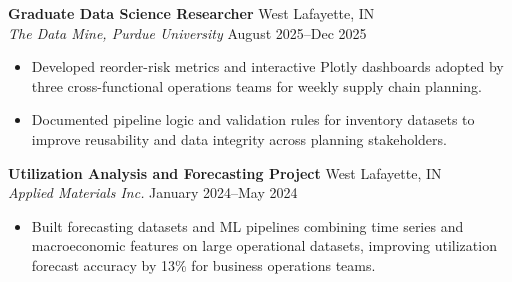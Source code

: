 \documentclass[11pt,a4paper]{article}
\begin{document}
\noindent
\textbf{Graduate Data Science Researcher} \hfill West Lafayette, IN \\
\textit{The Data Mine, Purdue University} \hfill August 2025--Dec 2025
\begin{itemize}[leftmargin=*, noitemsep, topsep=0pt]
    \item Developed reorder-risk metrics and interactive Plotly dashboards adopted by three cross-functional operations teams for weekly supply chain planning.
    \item Documented pipeline logic and validation rules for inventory datasets to improve reusability and data integrity across planning stakeholders.
\end{itemize}
\vspace{6pt}

\noindent
\textbf{Utilization Analysis and Forecasting Project} \hfill West Lafayette, IN \\
\textit{Applied Materials Inc.} \hfill January 2024--May 2024
\begin{itemize}[leftmargin=*, noitemsep, topsep=0pt]
    \item Built forecasting datasets and ML pipelines combining time series and macroeconomic features on large operational datasets, improving utilization forecast accuracy by 13\% for business operations teams.
\end{itemize}
\end{document}
